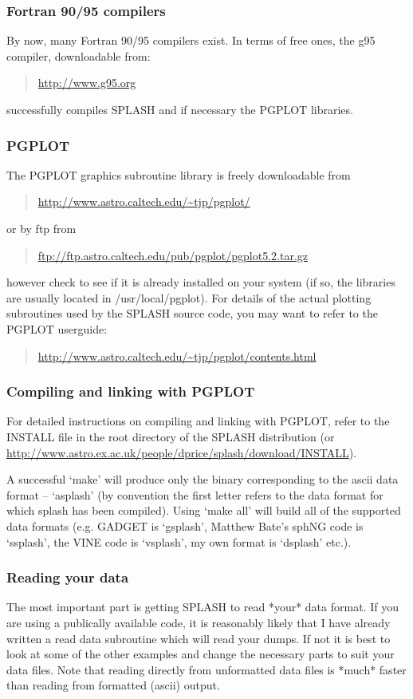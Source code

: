 \documentclass[a4paper,11pt]{article}
\begin{document}
\subsubsection{ Fortran 90/95 compilers}
 By now, many Fortran 90/95 compilers exist. In terms of free ones, the g95 compiler, downloadable from:
\begin{quote}
\url{http://www.g95.org}
\end{quote}
successfully compiles SPLASH and if necessary the PGPLOT libraries.

\subsubsection{ PGPLOT}
 The PGPLOT
graphics subroutine library is freely downloadable from
\begin{quote}
\url{http://www.astro.caltech.edu/~tjp/pgplot/}
\end{quote}
or by ftp from
\begin{quote}
\url{ftp://ftp.astro.caltech.edu/pub/pgplot/pgplot5.2.tar.gz}
\end{quote}
however check to see if it is already installed on your system (if so, the libraries are
usually located in /usr/local/pgplot). For details of the actual plotting subroutines
used by the SPLASH source code, you may want to refer to the PGPLOT userguide:
\begin{quote}
\url{http://www.astro.caltech.edu/~tjp/pgplot/contents.html}
\end{quote}

\subsubsection{ Compiling and linking with PGPLOT}
For detailed instructions on compiling and linking with PGPLOT, refer to the INSTALL file in the root directory of the SPLASH distribution (or \url{http://www.astro.ex.ac.uk/people/dprice/splash/download/INSTALL}).

A successful `make' will produce only the binary corresponding to the ascii data format -- `asplash' (by convention the first letter refers to the data format for which splash has been compiled). Using `make all' will build all of the supported data formats (e.g. GADGET is `gsplash', Matthew Bate's sphNG code is `ssplash', the VINE code is `vsplash', my own format is `dsplash' etc.). 

\subsubsection{ Reading your data}
 The most important part is getting SPLASH to read *your* data format.
If you are using a publically available code, it is reasonably likely that I
have already written a read data subroutine which will read your dumps.
If not it is best to look at some of the other examples and change the 
necessary parts to suit your data files. Note that reading directly from
unformatted data files is *much* faster than reading from formatted (ascii)
output.   
\end{document}
